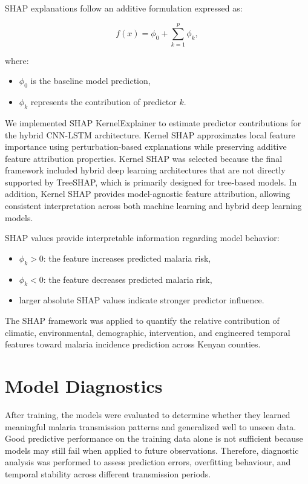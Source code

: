 SHAP explanations follow an additive formulation expressed as:

\[
f(x) = \phi_0 + \sum_{k=1}^{p} \phi_k,
\]

where:
\begin{itemize}
	\item \(\phi_0\) is the baseline model prediction,
	\item \(\phi_k\) represents the contribution of predictor \(k\).
\end{itemize}
We implemented SHAP KernelExplainer to estimate predictor contributions for the hybrid CNN-LSTM architecture. Kernel SHAP approximates local feature importance using perturbation-based explanations while preserving additive feature attribution properties.
Kernel SHAP was selected because the final framework included hybrid deep learning architectures that are not directly supported by TreeSHAP, which is primarily designed for tree-based models. In addition, Kernel SHAP provides model-agnostic feature attribution, allowing consistent interpretation across both machine learning and hybrid deep learning models.

SHAP values provide interpretable information regarding model behavior:
\begin{itemize}
	\item \(\phi_k > 0\): the feature increases predicted malaria risk,
	\item \(\phi_k < 0\): the feature decreases predicted malaria risk,
	\item larger absolute SHAP values indicate stronger predictor influence.
\end{itemize}

The SHAP framework was applied to quantify the relative contribution of climatic, environmental, demographic, intervention, and engineered temporal features toward malaria incidence prediction across Kenyan counties.
	
	

	\section{Model Diagnostics}
	
	After training, the models were evaluated to determine whether they learned meaningful malaria transmission patterns and generalized well to unseen data. Good predictive performance on the training data alone is not sufficient because models may still fail when applied to future observations. Therefore, diagnostic analysis was performed to assess prediction errors, overfitting behaviour, and temporal stability across different transmission periods.
	
